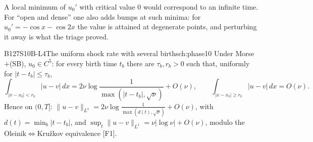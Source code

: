 \begin{caution}[title=The case of minima of value zero (triage fix P3-c)]
A local minimum of $u_0'$ with critical value $0$ would correspond to an infinite time. For ``open and dense'' one also adds bumps at such minima: for $u_0'=-\cos x-\cos2x$ the value is attained at degenerate points, and perturbing it away is what the triage proved.
\end{caution}

\begin{dimcard}{B127}{S10B-L4}{The uniform shock rate with several births}{\modulo{[F1]}}{ch:phase10}
Under Morse$+$(SB), $u_0\in C^5$: for every birth time $t_b$ there are $\tau_b,r_b>0$ such that, uniformly for $|t-t_b|\le\tau_b$,
\[
\int_{|x-x_b|<r_b}|u-v|\,dx=2\nu\log\frac1{\max(|t-t_b|,\sqrt\nu)}+O(\nu),\qquad \int_{|x-x_b|\ge r_b}|u-v|\,dx=O(\nu).
\]
Hence on $(0,T]$: $\|u-v\|_{L^1}=2\nu\log\frac1{\max(d(t),\sqrt\nu)}+O(\nu)$, with $d(t)=\min_b|t-t_b|$, and $\sup_t\|u-v\|_{L^1}=\nu|\log\nu|+O(\nu)$, modulo the Oleinik$\iff$Kru\v zkov equivalence [F1].
\end{dimcard}

